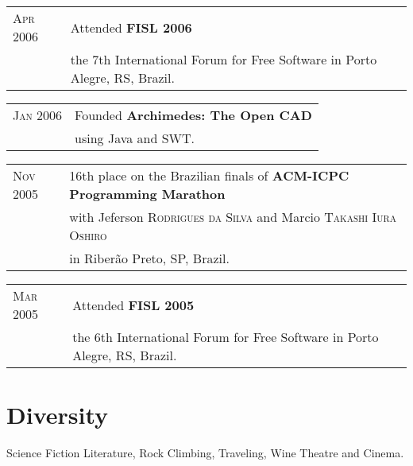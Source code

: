 \documentclass[letter,10pt]{article}
\begin{document}
\begin{tabular}{p{2.5cm}l}
  \textsc{Apr 2006} & Attended \textbf{FISL 2006}\\
  & the 7th International Forum for Free Software in Porto
  Alegre, RS, Brazil.\\
\end{tabular}

\begin{tabular}{p{2.5cm}l}
  \textsc{Jan 2006} & Founded \textbf{Archimedes: The Open CAD}\\
  & using Java and SWT.\\
\end{tabular}

\begin{tabular}{p{2.5cm}l}
  \textsc{Nov 2005} & 16th place on the Brazilian finals of \textbf{ACM-ICPC
    Programming Marathon}\\
  & with Jeferson \textsc{Rodrigues da Silva} and Marcio
  \textsc{Takashi Iura Oshiro}\\
  & in Riberão Preto, SP, Brazil.\\
\end{tabular}

\begin{tabular}{p{2.5cm}l}
  \textsc{Mar 2005} & Attended \textbf{FISL 2005}\\
  & the 6th International Forum for Free Software in Porto
  Alegre, RS, Brazil.\\
\end{tabular}

\section{Diversity}

Science Fiction Literature, Rock Climbing, Traveling, Wine
Theatre and Cinema.
\end{document}
